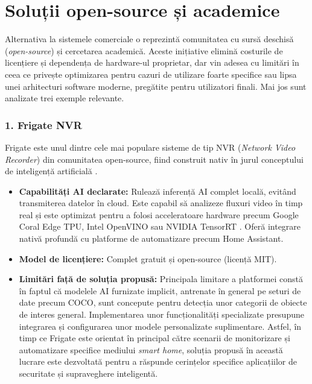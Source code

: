 \documentclass[../../main.tex]{subfiles}
\begin{document}
\section{Soluții open-source și academice}
\label{sec:solutii_open_source}

Alternativa la sistemele comerciale o reprezintă comunitatea cu sursă deschisă (\emph{open-source}) și cercetarea academică. Aceste inițiative elimină costurile de licențiere și dependența de hardware-ul proprietar, dar vin adesea cu limitări în ceea ce privește optimizarea pentru cazuri de utilizare foarte specifice sau lipsa unei arhitecturi software moderne, pregătite pentru utilizatori finali. Mai jos sunt analizate trei exemple relevante.

\subsubsection*{1. Frigate NVR}
Frigate este unul dintre cele mai populare sisteme de tip NVR (\emph{Network Video Recorder}) din comunitatea open-source, fiind construit nativ în jurul conceptului de inteligență artificială \cite{frigate_nvr}.
\begin{itemize}
	\item \textbf{Capabilități AI declarate:} Rulează inferență AI complet locală, evitând transmiterea datelor în cloud. Este capabil să analizeze fluxuri video în timp real și este optimizat pentru a folosi acceleratoare hardware precum Google Coral Edge TPU, Intel OpenVINO sau NVIDIA TensorRT \cite{frigate_nvr}. Oferă integrare nativă profundă cu platforme de automatizare precum Home Assistant.
	\item \textbf{Model de licențiere:} Complet gratuit și open-source (licență MIT).
	\item \textbf{Limitări față de soluția propusă:} Principala limitare a platformei constă în faptul că modelele AI furnizate implicit, antrenate în general pe seturi de date precum COCO, sunt concepute pentru detecția unor categorii de obiecte de interes general. Implementarea unor funcționalități specializate presupune integrarea și configurarea unor modele personalizate suplimentare. Astfel, în timp ce Frigate este orientat în principal către scenarii de monitorizare și automatizare specifice mediului \emph{smart home}, soluția propusă în această lucrare este dezvoltată pentru a răspunde cerințelor specifice aplicațiilor de securitate și supraveghere inteligentă.
\end{itemize}
\end{document}
